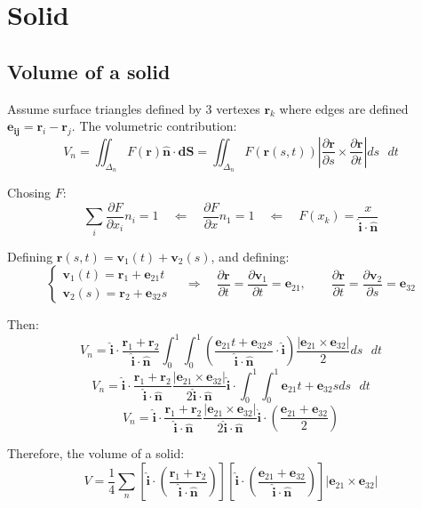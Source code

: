 \section{Solid}
\subsection{Volume of a solid}
Assume surface triangles defined by 3 vertexes $\mathbf r_k$ where edges are defined $\mathbf {e_{ij}} = \mathbf r_i - \mathbf r_j$. The volumetric contribution:
$$
V_n = \iint_{\Delta_n} F(\mathbf r)\mathbf{\hat n}\cdot\mathbf{dS} = 
\iint_{\Delta_n} F(\mathbf r(s, t))\left|\frac{\partial\mathbf r}{\partial s}\times\frac{\partial\mathbf r}{\partial t} \right| ds\mbox{ }dt
$$

Chosing $F$:
$$
\sum_i \frac{\partial F}{\partial x_i}n_i = 1 \quad\Longleftarrow\quad
\frac{\partial F}{\partial x}n_1 = 1 \quad\Longleftarrow\quad
F(x_k) = \frac{x}{\mathbf{\hat i}\cdot\mathbf{\hat n}}
$$


Defining $\mathbf r(s, t) = \mathbf v_1(t) + \mathbf v_2 (s)$, and defining:
\[
  \begin{cases}
   \mathbf v_1(t) = \mathbf r_1 + \mathbf e_{21}t  \\
   \mathbf v_2(s) = \mathbf r_2 + \mathbf e_{32}s
  \end{cases}
  \quad\Longrightarrow\quad
  \frac{\partial\mathbf r}{\partial t} = \frac{\partial\mathbf v_1}{\partial t} = \mathbf e_{21}, \quad\quad
  \frac{\partial\mathbf r}{\partial t} = \frac{\partial\mathbf v_2}{\partial s} = \mathbf e_{32}
\]

Then:
$$
V_n = \mathbf{\hat i}\cdot\frac{\mathbf r_1 + \mathbf r_2}{\mathbf{\hat i}\cdot\mathbf{\hat n}}
\int_0^1\int_0^1 \left(\frac{\mathbf e_{21}t + \mathbf e_{32}s}{\mathbf{\hat i}\cdot\mathbf{\hat n}}\cdot\mathbf{\hat i}\right) \frac{\left|\mathbf e_{21}\times\mathbf e_{32} \right|}{2} ds\mbox{ }dt
$$
$$
V_n = \mathbf{\hat i}\cdot\frac{\mathbf r_1 + \mathbf r_2}{\mathbf{\hat i}\cdot\mathbf{\hat n}} 
\frac{\left|\mathbf e_{21}\times\mathbf e_{32} \right|}{2 \mathbf{\hat i}\cdot\mathbf{\hat n}}\mathbf{\hat i}\cdot
\int_0^1\int_0^1 \mathbf e_{21}t + \mathbf e_{32}s ds\mbox{ }dt
$$
$$
V_n = \mathbf{\hat i}\cdot\frac{\mathbf r_1 + \mathbf r_2}{\mathbf{\hat i}\cdot\mathbf{\hat n}} 
\frac{\left|\mathbf e_{21}\times\mathbf e_{32} \right|}{2 \mathbf{\hat i}\cdot\mathbf{\hat n}}\mathbf{\hat i}\cdot
\left(\frac{\mathbf e_{21} + \mathbf e_{32}}{2}\right)
$$

Therefore, the volume of a solid:
$$
V =  \frac{1}{4} \sum_n
\left[ \mathbf{\hat i}\cdot \left( \frac{\mathbf r_1 + \mathbf r_2}{\mathbf{\hat i}\cdot\mathbf{\hat n}}\right) \right]
\left[ \mathbf{\hat i}\cdot \left( \frac{\mathbf e_{21} + \mathbf e_{32}}{\mathbf{\hat i}\cdot\mathbf{\hat n}}\right) \right]
\left|\mathbf e_{21}\times\mathbf e_{32} \right|
$$
